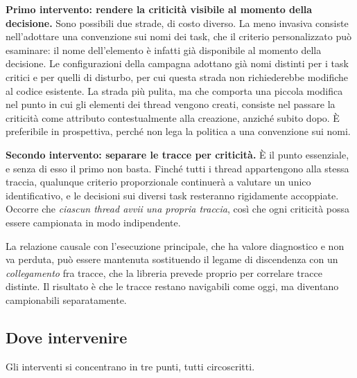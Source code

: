 \documentclass[11pt,a4paper]{article}
\begin{document}
\textbf{Primo intervento: rendere la criticit\`a visibile al momento della decisione.} Sono
possibili due strade, di costo diverso. La meno invasiva consiste nell'adottare una convenzione sui
nomi dei task, che il criterio personalizzato pu\`o esaminare: il nome dell'elemento \`e infatti
gi\`a disponibile al momento della decisione. Le configurazioni della campagna adottano gi\`a nomi
distinti per i task critici e per quelli di disturbo, per cui questa strada non richiederebbe
modifiche al codice esistente. La strada pi\`u pulita, ma che comporta una piccola modifica nel
punto in cui gli elementi dei thread vengono creati, consiste nel passare la criticit\`a come
attributo contestualmente alla creazione, anzich\'e subito dopo. \`E preferibile in prospettiva,
perch\'e non lega la politica a una convenzione sui nomi.

\textbf{Secondo intervento: separare le tracce per criticit\`a.} \`E il punto essenziale, e senza
di esso il primo non basta. Finch\'e tutti i thread appartengono alla stessa traccia, qualunque
criterio proporzionale continuer\`a a valutare un unico identificativo, e le decisioni sui diversi
task resteranno rigidamente accoppiate. Occorre che \emph{ciascun thread avvii una propria traccia},
cos\`i che ogni criticit\`a possa essere campionata in modo indipendente.

La relazione causale con l'esecuzione principale, che ha valore diagnostico e non va perduta, pu\`o
essere mantenuta sostituendo il legame di discendenza con un \emph{collegamento} fra tracce, che la
libreria prevede proprio per correlare tracce distinte. Il risultato \`e che le tracce restano
navigabili come oggi, ma diventano campionabili separatamente.

\subsection{Dove intervenire}

Gli interventi si concentrano in tre punti, tutti circoscritti.
\end{document}
